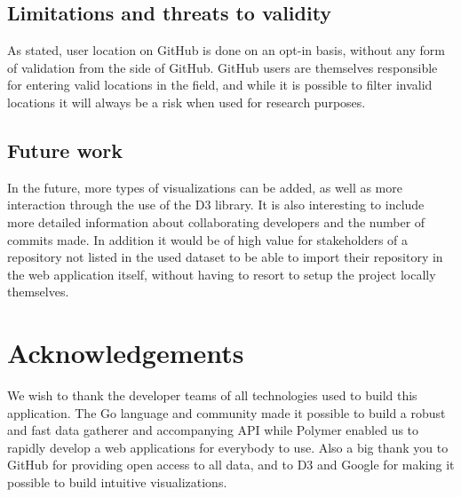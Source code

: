 \documentclass[acmtog, authorversion]{acmart}
\begin{document}
\subsection{Limitations and threats to validity}
As stated, user location on GitHub is done on an opt-in basis, without any form of validation from the side of GitHub.
GitHub users are themselves responsible for entering valid locations in the field, and while it is possible to filter invalid locations it will always be a risk when used for research purposes.

\subsection{Future work}
In the future, more types of visualizations can be added, as well as more interaction through the use of the D3 library.
It is also interesting to include more detailed information about collaborating developers and the number of commits made.
In addition it would be of high value for stakeholders of a repository not listed in the used dataset to be able to import their repository in the web application itself, without having to resort to setup the project locally themselves.

\section{Acknowledgements}
We wish to thank the developer teams of all technologies used to build this application. 
The Go language and community made it possible to build a robust and fast data gatherer and accompanying API while Polymer enabled us to rapidly develop a web applications for everybody to use.
Also a big thank you to GitHub for providing open access to all data, and to D3 and Google for making it possible to build intuitive visualizations.



\end{document}
